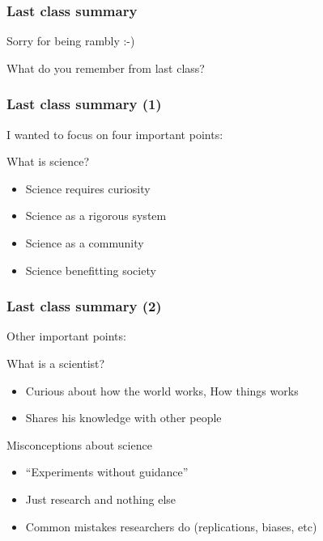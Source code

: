 \documentclass{beamer}
\begin{document}
\begin{frame}
  \frametitle{Last class summary}
  Sorry for being rambly :-)

  \bigskip

  What do you remember from last class?
  
\end{frame}

\begin{frame}
  \frametitle{Last class summary (1)}

  I wanted to focus on four important points:
  
  \bigskip

  \begin{block}{What is science?}    
    \begin{itemize}
    \item Science requires curiosity
    \item Science as a rigorous system 
    \item Science as a community
    \item Science benefitting society 
    \end{itemize}    
  \end{block}
\end{frame}

\begin{frame}
  \frametitle{Last class summary (2)}
  Other important points:
  \bigskip
  \begin{exampleblock}{What is a scientist?}
    \begin{itemize}
    \item Curious about how the world works, How things works
    \item Shares his knowledge with other people
    \end{itemize}
  \end{exampleblock}
  
  \medskip
  
  \begin{alertblock}{Misconceptions about science}
    \begin{itemize}
    \item ``Experiments without guidance''
    \item Just research and nothing else
    \item Common mistakes researchers do (replications, biases, etc)
    \end{itemize}
  \end{alertblock}
\end{frame}
\end{document}
